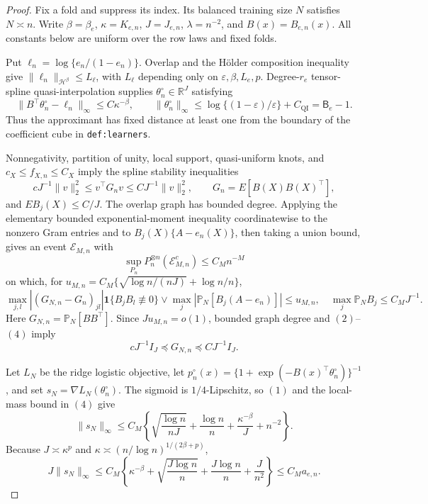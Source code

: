 \documentclass{article}
\begin{document}
\begin{proof}
Fix a fold and suppress its index. Its balanced training size \(N\) satisfies \(N\asymp n\). Write \(\beta=\beta_e\), \(\kappa=K_{e,n}\), \(J=J_{e,n}\), \(\lambda=n^{-2}\), and \(B(x)=B_{e,n}(x)\). All constants below are uniform over the row laws and fixed folds.

Put \(\ell_n=\log\{e_n/(1-e_n)\}\). Overlap and the H\"older composition inequality give \(\lVert\ell_n\rVert_{\mathcal H^\beta}\le L_\ell\), with \(L_\ell\) depending only on \(\varepsilon,\beta,L_e,p\). Degree-\(r_e\) tensor-spline quasi-interpolation supplies \(\theta_n^\circ\in\mathbb R^J\) satisfying
\[\lVert B^\top\theta_n^\circ-\ell_n\rVert_\infty\le C\kappa^{-\beta},\qquad \lVert\theta_n^\circ\rVert_\infty\le \log\{(1-\varepsilon)/\varepsilon\}+C_{\mathrm{QI}}=\mathsf B_e-1.\tag{1}\]
Thus the approximant has fixed distance at least one from the boundary of the coefficient cube in \texttt{def:learners}.

Nonnegativity, partition of unity, local support, quasi-uniform knots, and \(c_X\le f_{X,n}\le C_X\) imply the spline stability inequalities
\[cJ^{-1}\lVert v\rVert_2^2\le v^\top G_nv\le CJ^{-1}\lVert v\rVert_2^2,\qquad G_n=E[B(X)B(X)^\top],\tag{2}\]
and \(E B_j(X)\le C/J\). The overlap graph has bounded degree. Applying the elementary bounded exponential-moment inequality coordinatewise to the nonzero Gram entries and to \(B_j(X)\{A-e_n(X)\}\), then taking a union bound, gives an event \(\mathcal E_{M,n}\) with
\[\sup_{P_n}P_n^{\otimes n}(\mathcal E_{M,n}^c)\le C_Mn^{-M}\tag{3}\]
on which, for \(u_{M,n}=C_M\{\sqrt{\log n/(nJ)}+\log n/n\}\),
\[\max_{j,l}|(G_{N,n}-G_n)_{jl}|\mathbf 1\{B_jB_l\not\equiv0\}\vee\max_j|\mathbb P_N[B_j(A-e_n)]|\le u_{M,n},\quad \max_j\mathbb P_NB_j\le C_MJ^{-1}.\tag{4}\]
Here \(G_{N,n}=\mathbb P_N[BB^\top]\). Since \(Ju_{M,n}=o(1)\), bounded graph degree and \((2)\)--\((4)\) imply
\[cJ^{-1}I_J\preceq G_{N,n}\preceq CJ^{-1}I_J.\tag{5}\]

Let \(L_N\) be the ridge logistic objective, let \(p_n^\circ(x)=\{1+\exp(-B(x)^\top\theta_n^\circ)\}^{-1}\), and set \(s_N=\nabla L_N(\theta_n^\circ)\). The sigmoid is \(1/4\)-Lipschitz, so \((1)\) and the local-mass bound in \((4)\) give
\[\lVert s_N\rVert_\infty\le C_M\left\{\sqrt{\frac{\log n}{nJ}}+\frac{\log n}{n}+\frac{\kappa^{-\beta}}J+n^{-2}\right\}.\tag{6}\]
Because \(J\asymp\kappa^p\) and \(\kappa\asymp(n/\log n)^{1/(2\beta+p)}\),
\[J\lVert s_N\rVert_\infty\le C_M\left\{\kappa^{-\beta}+\sqrt{\frac{J\log n}{n}}+\frac{J\log n}{n}+\frac J{n^2}\right\}\le C_Ma_{e,n}.\tag{7}\]


\end{proof}
\end{document}
